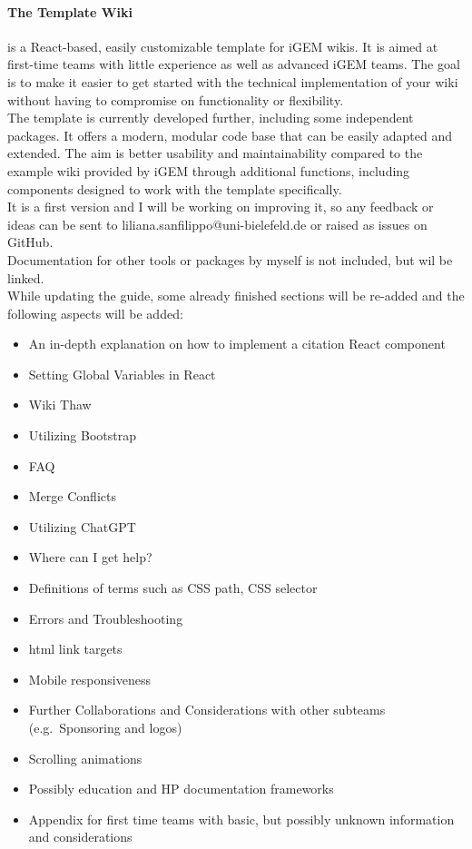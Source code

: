 \documentclass[a4paper, 11pt, twoside]{book}
\begin{document}
\paragraph{The Template Wiki} is a React-based, easily customizable template for iGEM wikis.
It is aimed at first-time teams with little experience as well as advanced iGEM teams.
The goal is to make it easier to get started with the technical implementation of your wiki without having to compromise on functionality or flexibility. \\ \newline
The template is currently developed further, including some independent packages.
It offers a modern, modular code base that can be easily adapted and extended.
The aim is better usability and maintainability compared to the example wiki provided by iGEM through additional functions, including components designed to work with the template specifically. \\ \newline
It is a first version and I will be working on improving it, so any feedback or ideas can be sent to liliana.sanfilippo@uni-bielefeld.de or raised as issues on GitHub. \\ \newline
Documentation for other tools or packages by myself is not included, but wil be linked. \\ \newline
While updating the guide, some already finished sections will be re-added and the following aspects will be added:
\begin{itemize}
    \item An in-depth explanation on how to implement a citation React component
    \item Setting Global Variables in React
    \item Wiki Thaw
    \item Utilizing Bootstrap
    \item FAQ
    \item Merge Conflicts
    \item Utilizing ChatGPT
    \item Where can I get help?
    \item Definitions of terms such as CSS path, CSS selector
    \item Errors and Troubleshooting
    \item html link targets
    \item Mobile responsiveness
    \item Further Collaborations and Considerations with other subteams (e.g.\ Sponsoring and logos)
    \item Scrolling animations
    \item Possibly education and HP documentation frameworks
    \item Appendix for first time teams with basic, but possibly unknown information and considerations
\end{itemize}
\end{document}
